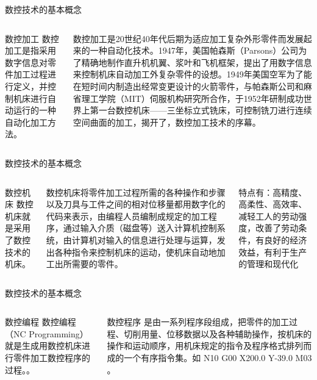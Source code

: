 \documentclass[UTF8,zihao=-4]{ctexbeamer}
\begin{document}
\begin{frame}{数控技术的基本概念}
\begin{columns}
	\begin{block}{\centering 数控加工}
		数控加工是指采用数字信息对零件加工过程进行定义，并控制机床进行自动运行的一种自动化加工方法。
	\end{block}
数控加工是20世纪40年代后期为适应加工复杂外形零件而发展起来的一种自动化技术。1947年，美国帕森斯（Parsons）公司为了精确地制作直升机机翼、浆叶和飞机框架，提出了用数字信息来控制机床自动加工外复杂零件的设想。1949年美国空军为了能在短时间内制造出经常变更设计的火箭零件，与帕森斯公司和麻省理工学院（MIT）伺服机构研究所合作，于1952年研制成功世界上第一台数控机床——三坐标立式铣床，可控制铣刀进行连续空间曲面的加工，揭开了，数控加工技术的序幕。
\end{columns}
\end{frame}

\begin{frame}{数控技术的基本概念}
\begin{columns}
	\begin{block}{\centering 数控机床}
		数控机床就是采用了数控技术的机床。
	
	\end{block}
		数控机床将零件加工过程所需的各种操作和步骤以及刀具与工件之间的相对位移量都用数字化的代码来表示，由编程人员编制成规定的加工程序，通过输入介质（磁盘等）送入计算机控制系统，由计算机对输入的信息进行处理与运算，发出各种指令来控制机床的运动，使机床自动地加工出所需要的零件。
	
	特点有：高精度、高柔性、高效率、减轻工人的劳动强度，改善了劳动条件，有良好的经济效益，有利于生产的管理和现代化
\end{columns}
\end{frame}

\begin{frame}{数控技术的基本概念}
\begin{columns}
	\begin{block}{\centering 数控编程}
		数控编程（NC Programming）就是生成用数控机床进行零件加工数控程序的过程。。
		
	\end{block}
数控程序  是由一系列程序段组成，把零件的加工过程、切削用量、位移数据以及各种辅助操作，按机床的操作和运动顺序，用机床规定的指令及程序格式排列而成的一个有序指令集。如 N10 G00 X200.0 Y-39.0 M03 。
\end{columns}
\end{frame}
\end{document}
